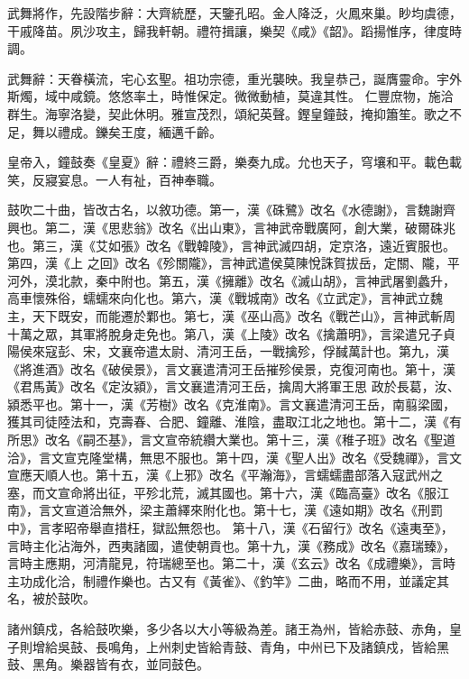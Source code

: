 \begin{pinyinscope}
 武舞將作，先設階步辭：大齊統歷，天鑒孔昭。金人降泛，火鳳來巢。眇均虞德，干戚降苗。夙沙攻主，歸我軒朝。禮符揖讓，樂契《咸》《韶》。蹈揚惟序，律度時調。



 武舞辭：天眷橫流，宅心玄聖。祖功宗德，重光襲映。我皇恭己，誕膺靈命。宇外斯燭，域中咸鏡。悠悠率土，時惟保定。微微動植，莫違其性。
 仁豐庶物，施洽群生。海寧洛變，契此休明。雅宣茂烈，頌紀英聲。鏗皇鐘鼓，掩抑簫笙。歌之不足，舞以禮成。鑠矣王度，緬邁千齡。



 皇帝入，鐘鼓奏《皇夏》辭：禮終三爵，樂奏九成。允也天子，穹壤和平。載色載笑，反寢宴息。一人有祉，百神奉職。



 鼓吹二十曲，皆改古名，以敘功德。第一，漢《硃鷺》改名《水德謝》，言魏謝齊興也。第二，漢《思悲翁》改名《出山東》，言神武帝戰廣阿，創大業，破爾硃兆也。第三，漢《艾如張》改名《戰韓陵》，言神武滅四胡，定京洛，遠近賓服也。第四，漢《上
 之回》改名《殄關隴》，言神武遣侯莫陳悅誅賀拔岳，定關、隴，平河外，漠北款，秦中附也。第五，漢《擁離》改名《滅山胡》，言神武屠劉蠡升，高車懷殊俗，蠕蠕來向化也。第六，漢《戰城南》改名《立武定》，言神武立魏主，天下既安，而能遷於鄴也。第七，漢《巫山高》改名《戰芒山》，言神武斬周十萬之眾，其軍將脫身走免也。第八，漢《上陵》改名《擒蕭明》，言梁遣兄子貞陽侯來寇彭、宋，文襄帝遣太尉、清河王岳，一戰擒殄，俘馘萬計也。第九，漢《將進酒》改名《破侯景》，言文襄遣清河王岳摧殄侯景，克復河南也。第十，漢《君馬黃》改名《定汝潁》，言文襄遣清河王岳，擒周大將軍王思
 政於長葛，汝、潁悉平也。第十一，漢《芳樹》改名《克淮南》。言文襄遣清河王岳，南翦梁國，獲其司徒陸法和，克壽春、合肥、鐘離、淮陰，盡取江北之地也。第十二，漢《有所思》改名《嗣丕基》，言文宣帝統纘大業也。第十三，漢《稚子班》改名《聖道洽》，言文宣克隆堂構，無思不服也。第十四，漢《聖人出》改名《受魏禪》，言文宣應天順人也。第十五，漢《上邪》改名《平瀚海》，言蠕蠕盡部落入寇武州之塞，而文宣命將出征，平殄北荒，滅其國也。第十六，漢《臨高臺》改名《服江南》，言文宣道洽無外，梁主蕭繹來附化也。第十七，漢《遠如期》改名《刑罰中》，言孝昭帝舉直措枉，獄訟無怨也。
 第十八，漢《石留行》改名《遠夷至》，言時主化沾海外，西夷諸國，遣使朝貢也。第十九，漢《務成》改名《嘉瑞臻》，言時主應期，河清龍見，符瑞總至也。第二十，漢《玄云》改名《成禮樂》，言時主功成化洽，制禮作樂也。古又有《黃雀》、《釣竿》二曲，略而不用，並議定其名，被於鼓吹。



 諸州鎮戍，各給鼓吹樂，多少各以大小等級為差。諸王為州，皆給赤鼓、赤角，皇子則增給吳鼓、長鳴角，上州刺史皆給青鼓、青角，中州已下及諸鎮戍，皆給黑鼓、黑角。樂器皆有衣，並同鼓色。




\end{pinyinscope}
